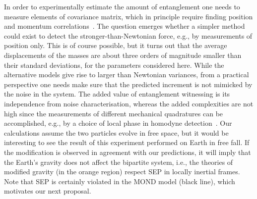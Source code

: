 \documentclass[aps,prl,reprint,superscriptaddress,nofootinbib,floatfix]{revtex4-2}
\begin{document}
In order to experimentally estimate the amount of entanglement one needs to measure elements of covariance matrix, which in principle require finding position and momentum correlations~\cite{Aspelmeyer-CavOpt-Rev}. The question emerges whether a simpler method could exist to detect the stronger-than-Newtonian force, e.g., by measurements of position only. This is of course possible, but it turns out that the average displacements of the masses are about three orders of magnitude smaller than their standard deviations, for the parameters considered here.
While the alternative models give rise to larger than Newtonian variances, from a practical perspective one needs make sure that the predicted increment is not mimicked by the noise in the system.
The added value of entanglement witnessing is its independence from noise characterisation, whereas the added complexities are not high since the measurements of different mechanical quadratures can be accomplished, e.g., by a choice of local phase in homodyne detection~\cite{Aspelmeyer-CavOpt-Rev}.
Our calculations assume the two particles evolve in free space, but it would be interesting to see the result of this experiment performed on Earth in free fall.
If the modification is observed in agreement with our predictions, it will imply that the Earth's gravity does not affect the bipartite system, i.e., the theories of modified gravity (in the orange region) respect SEP in locally inertial frames.
Note that SEP is certainly violated in the MOND model (black line), which motivates our next proposal.
\end{document}
